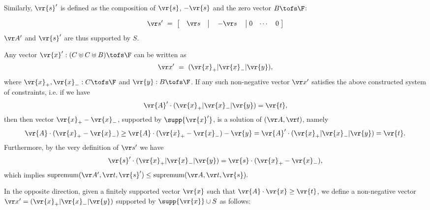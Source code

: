 \noindent
Similarly, $\vr{s}'$ is defined as the composition of $\vr{s}$, $-\vr{s}$ and the zero vector $B \tofs \F$:

\vspace{-4mm}
\begin{align*}
\vr s' \ = \ 
\left[
\begin{matrix}
  & \vr s & 
\end{matrix}
\right\rvert
\begin{matrix}
  & - \vr s &   
\end{matrix}
\left\rvert
\begin{matrix}
\; 0 & \cdots & 0 \;  
\end{matrix}
\right]
\end{align*}
$\vr A'$ and $\vr{s}'$ are thus supported by $S$.

Any vector 
$
\vr{x}' :(C \uplus C \uplus B) \tofs \F
$
can be written as
\[
\vr x' \ = \ (\vr{x}_+ \rvert \vr{x}_- \rvert \vr{y}),
\]
where $\vr{x}_+,\vr{x}_- : C \tofs \F$ and $\vr{y} : B \tofs \F$.
%
If any such non-negative vector $\vr x'$ satisfies the above constructed system of constraints, i.e. if we have
%
\begin{equation}\label{eq: non-neg max equiv to ineq}
\vr{A}' \cdot (\vr{x}_+ \rvert \vr{x}_- \rvert \vr{y}) = \vr{t},
\end{equation}
%
then then vector ${\vr{x}_+ - \vr{x}_-}$, supported by $\supp{\vr{x}'}$,
is a solution of $(\vr A, \vr t)$, namely
\[
\vr{A} \cdot (\vr{x}_+ - \vr{x}_-) \geq
\vr{A} \cdot (\vr{x}_+ - \vr{x}_-) - \vr{y} =
\vr{A}' \cdot (\vr{x}_+ \rvert \vr{x}_- \rvert \vr{y}) = \vr{t}.
\]
Furthermore, by the very definition of $\vr s'$ we have
%
\begin{align} \label{eq:ss}
\vr{s}' \cdot (\vr{x}_+ \rvert \vr{x}_- \rvert \vr{y}) = \vr{s} \cdot (\vr{x}_+ - \vr{x}_-),
\end{align}
%
which implies
$
\textnormal{supremum}(\vr A', \vr t, \vr{s}')
\leq
\textnormal{supremum}(\vr A, \vr t, \vr{s}).
$

In the opposite direction, given a finitely supported vector $\vr{x}$ such that 
$\vr{A} \cdot \vr{x} \geq \vr{t}$, we define a non-negative vector 
$\vr x' = (\vr{x}_+ \rvert \vr{x}_- \rvert \vr{y})$ supported by $\supp{\vr{x}}\cup S$ as follows:

